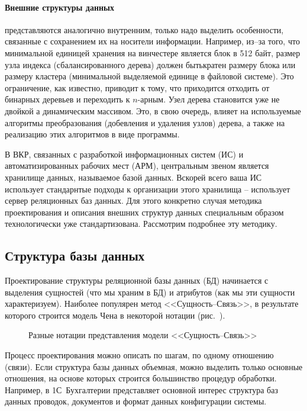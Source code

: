 \documentclass[a4paper,14pt,final]{extreport}
\begin{document}
\paragraph{Внешние структуры данных} представляются аналогично внутренним, только надо выделить особенности, связанные с сохранением их на носители информации.  Например, из--за того, что минимальной единицей хранения на винчестере является блок в 512 байт, размер узла индекса (сбалансированного дерева) должен бытькратен размеру блока или размеру кластера (минимальной выделяемой единице в файловой системе).  Это ограничение, как известно, приводит к тому, что приходится отходить от бинарных деревьев и переходить к $n$-арным.  Узел дерева становится уже не двойкой а динамическим массивом.  Это, в свою очередь, влияет на используемые алгоритмы преобразования (добевления и удаления узлов) дерева, а также на реализацию этих алгоритмов в виде программы.

В ВКР, связанных с разработкой информационных систем (ИС) и автоматизированных рабочих мест (АРМ), центральным звеном является хранилище данных, называемое базой данных.  Вскорей всего ваша ИС использует стандарнтые подходы к организации этого хранилища -- использует сервер реляционных баз данных.  Для этого конкретно случая методика проектирования и описания внешних структур данных специальным образом технологически уже стандартизована.  Рассмотрим подробнее эту методику.

\subsection{Структура базы данных}
\label{sec:databasestruct}

Проектирование структуры реляционной базы данных (БД) начинается с выделения сущностей (что мы храним в БД) и атрибутов (как мы эти сущности характеризуем).  Наиболее популярен метод <<Сущность--Связь>>, в результате которого строится модель Чена в некоторой нотации (рис.~).
\begin{figure}[hbt]
  \centering

  \caption[Нотации для модели Чена]{Разные нотации представления модели <<Сущность--Связь>>}
  \label{fig:changmodels}
\end{figure}
Процесс проектирования можно описать по шагам, по одному отношению (связи).  Если структура базы данных объемная, можно выделить только основные отношения, на основе которых строится большинство процедур обработки.  Например, в 1С~Бухгалтерии представляет основной интерес структура баз данных проводок, документов и формат данных конфигурации системы.
\end{document}
